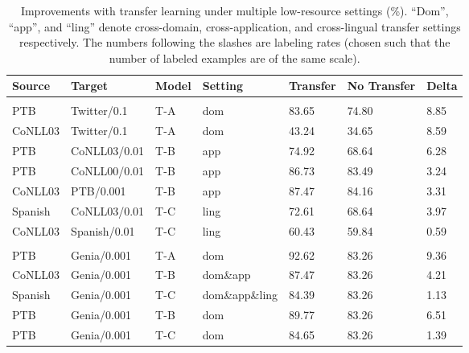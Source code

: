 \documentclass{article} \usepackage{iclr2017_conference,times}
\begin{document}
\begin{table*}[t]
\vspace{-0.1in}
\caption{\small Improvements with transfer learning under multiple low-resource settings (\%). ``Dom'', ``app'', and ``ling'' denote cross-domain, cross-application, and cross-lingual transfer settings respectively. The numbers following the slashes are labeling rates (chosen such that the number of labeled examples are of the same scale).}
\label{tab:imp}
\begin{center}
\begin{tabular}{lllllll}
Source & Target & Model & Setting & Transfer & No Transfer & Delta
\\ \hline \\
PTB & Twitter/0.1 & T-A & dom & 83.65 & 74.80 & 8.85 \\
CoNLL03 & Twitter/0.1 & T-A & dom & 43.24 & 34.65 & 8.59 \\
PTB & CoNLL03/0.01 & T-B & app & 74.92 & 68.64 & 6.28 \\
PTB & CoNLL00/0.01 & T-B & app & 86.73 & 83.49 & 3.24 \\
CoNLL03 & PTB/0.001 & T-B & app & 87.47 & 84.16 & 3.31 \\
Spanish & CoNLL03/0.01 & T-C & ling & 72.61 & 68.64 & 3.97 \\
CoNLL03 & Spanish/0.01 & T-C & ling & 60.43 & 59.84 & 0.59 \\
\hline \\
PTB & Genia/0.001 & T-A & dom & 92.62 & 83.26 & 9.36 \\
CoNLL03 & Genia/0.001 & T-B & dom\&app & 87.47 & 83.26 & 4.21 \\
Spanish & Genia/0.001 & T-C & dom\&app\&ling & 84.39 & 83.26 & 1.13 \\
PTB & Genia/0.001 & T-B & dom & 89.77 & 83.26 & 6.51 \\
PTB & Genia/0.001 & T-C & dom & 84.65 & 83.26 & 1.39 \\
\end{tabular}
\end{center}
\end{table*}
\end{document}
